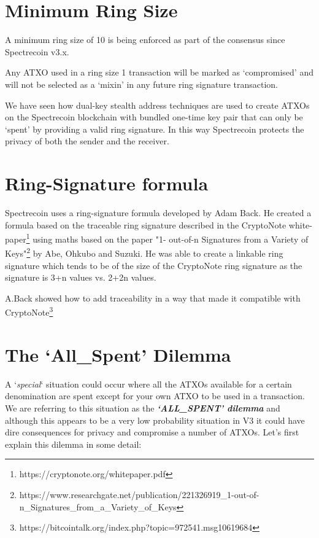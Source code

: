 \section{Minimum Ring Size}

A minimum ring size of 10 is being enforced as part of the consensus since Spectrecoin v3.x. 



Any ATXO used in a ring size 1 transaction will be marked as ‘compromised’ and will not be selected as a 
‘mixin’ in any future ring signature transaction. 



We have seen how dual-key stealth address techniques are used to create ATXOs on the Spectrecoin 
blockchain with bundled one-time key pair that can only be ‘spent’ by providing a valid ring signature. 
In this way Spectrecoin protects the privacy of both the sender and the receiver. 



\section{Ring-Signature formula}
Spectrecoin uses a ring-signature formula developed by Adam Back. He created a formula based on the 
traceable ring signature described in the CryptoNote white-paper\footnote{https://cryptonote.org/whitepaper.pdf} using maths based on the paper "1-
out-of-n Signatures from a Variety of Keys"\footnote{https://www.researchgate.net/publication/221326919\_1-out-of-n\_Signatures\_from\_a\_Variety\_of\_Keys} by Abe, Ohkubo and Suzuki. He was able to create a linkable ring signature which tends to be  of the size of the CryptoNote ring signature as the signature is 3+n 
values vs. 2+2n values.  



A.Back showed how to add traceability in a way that made it compatible with CryptoNote\footnote{https://bitcointalk.org/index.php?topic=972541.msg10619684}

\vspace{5mm} %



\vspace{5mm} %



\section{The ‘All\_Spent’ Dilemma}
A ‘\textit{special}‘ situation could occur where all the ATXOs available for a 
certain denomination are spent except for your own ATXO to be used in a transaction. 
We are referring to this situation as the \textbf{\textit{‘ALL\_SPENT’ dilemma}} 
and although this appears to be a very low probability situation in V3 it could 
have dire consequences for privacy and compromise a number of ATXOs. Let’s first 
explain this dilemma in some detail: 



